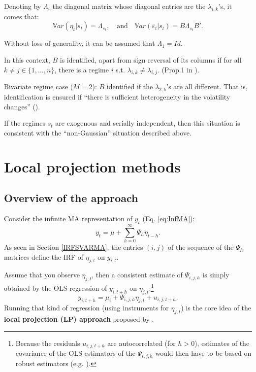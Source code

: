 \documentclass[
  12pt,
]{book}
\theoremstyle{definition}
\theoremstyle{definition}
\theoremstyle{definition}
\theoremstyle{definition}
\theoremstyle{remark}
\begin{document}
Denoting by \(\Lambda_i\) the diagonal matrix whose diagonal entries are the \(\lambda_{i,k}\)'s, it comes that:
\[
\mathbb{V}ar(\eta_{t}|s_t) = \Lambda_{s_t},\quad \mbox{and}\quad \mathbb{V}ar(\varepsilon_{t}|s_t) = B\Lambda_{s_t}B'.
\]

Without loss of generality, it can be assumed that \(\Lambda_1=Id\).

In this context, \(B\) is identified, apart from sign reversal of its columns if for all \(k \ne j \in \{1,\dots,n\}\), there is a regime \(i\) s.t. \(\lambda_{i,k} \ne \lambda_{i,j}\). (Prop.1 in \citet{LANNE2010121}).

Bivariate regime case (\(M=2\)): \(B\) identified if the \(\lambda_{2,k}\)'s are all different. That is, identification is ensured if ``there is sufficient heterogeneity in the volatility changes'' (\citet{LUTKEPOHL20172}).

If the regimes \(s_t\) are exogenous and serially independent, then this situation is consistent with the ``non-Gaussian'' situation described above.

\chapter{Local projection methods}\label{Projections}

\section{Overview of the approach}\label{overview-of-the-approach}

Consider the infinite MA representation of \(y_t\) (Eq. \eqref{eq:InfMA}):
\[
y_t = \mu + \sum_{h=0}^\infty \Psi_{h} \eta_{t-h}.
\]
As seen in Section \ref{IRFSVARMA}, the entries \((i,j)\) of the sequence of the \(\Psi_h\) matrices define the IRF of \(\eta_{j,t}\) on \(y_{i,t}\).

Assume that you observe \(\eta_{j,t}\), then a consistent estimate of \(\Psi_{i,j,h}\) is simply obtained by the OLS regression of \(y_{i,t+h}\) on \(\eta_{j,t}\):\footnote{Because the residuals \(u_{i,j,t+h}\) are autocorrelated (for \(h>0\)), estimates of the covariance of the OLS estimators of the \(\Psi_{i,j,h}\) would then have to be based on robust estimators (e.g. \citet{Newey_West_1987}).}
\begin{equation}
y_{i,t+h} = \mu_i + \Psi_{i,j,h}\eta_{j,t} + u_{i,j,t+h}.\label{eq:OLS1}
\end{equation}
Running that kind of regression (using instruments for \(\eta_{j,t}\)) is the core idea of the \textbf{local projection (LP) approach} proposed by \citet{Jorda_2005}.
\end{document}
